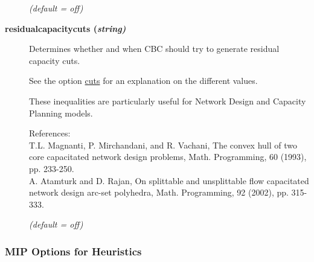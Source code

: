 \begin{description}
\textsl{(default = off)}

\item[\label{residualcapacitycuts}\hypertarget{residualcapacitycuts}
{\textbf{residualcapacitycuts (\slshape{string})}}]\hspace{1.0in}

Determines whether and when CBC should try to generate residual capacity cuts.

See the option \hyperlink{cuts}{cuts} for an explanation on the different values.

These inequalities are particularly useful for Network Design and Capacity Planning models.

References:\\
T.L. Magnanti, P. Mirchandani, and R. Vachani, The convex hull of two core capacitated network design problems, Math. Programming, 60 (1993), pp. 233-250.\\
A. Atamturk and D. Rajan, On splittable and unsplittable flow capacitated network design arc-set polyhedra, Math. Programming, 92 (2002), pp. 315-333.

\textsl{(default = off)}

\end{description}

\subsubsection{MIP Options for Heuristics}

